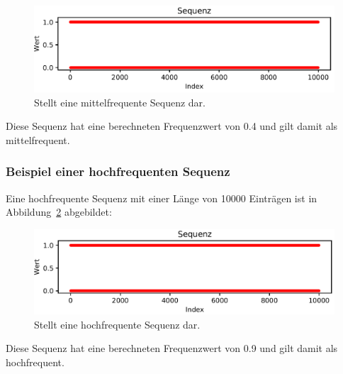 \begin{figure}[H]
	\includegraphics[width=\linewidth]{pythonImplementation/images/example_frequence_middle.PNG}
	\caption[Darstellung einer mittelfrequenten Sequenz]{Stellt eine mittelfrequente Sequenz dar\footnotemark.}
	\label{fig:example_frequence_middle}
\end{figure}

Diese Sequenz hat eine berechneten Frequenzwert von 0.4 und gilt damit als mittelfrequent.

\subsubsection{Beispiel einer hochfrequenten Sequenz}
Eine hochfrequente Sequenz mit einer Länge von 10000 Einträgen ist in Abbildung~\ref{fig:example_frequence_high} abgebildet:

\begin{figure}[H]
	\includegraphics[width=\linewidth]{pythonImplementation/images/example_frequence_high.PNG}
	\caption[Darstellung einer hochfrequenten Sequenz]{Stellt eine hochfrequente Sequenz dar\footnotemark.}
	\label{fig:example_frequence_high}
\end{figure}

Diese Sequenz hat eine berechneten Frequenzwert von 0.9 und gilt damit als hochfrequent.

